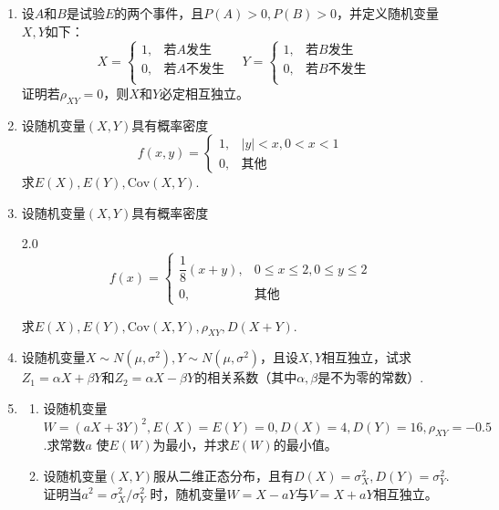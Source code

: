 \begin{enumerate}
    \item 设$A$和$B$是试验$E$的两个事件，且$P(A)>0,P(B)>0$，并定义随机变量$X,Y$如下：
    $$X=\left\{\begin{array}{ll}
        1, & \mbox{若}A\mbox{发生}\\
        0, & \mbox{若}A\mbox{不发生}\\
    \end{array}\right.\quad
    Y=\left\{\begin{array}{ll}
        1, & \mbox{若}B\mbox{发生}\\
        0, & \mbox{若}B\mbox{不发生}\\
    \end{array}\right.\quad$$
    证明若$\rho_{XY}=0$，则$X$和$Y$必定相互独立。


    \item 设随机变量$(X,Y)$具有概率密度
    $$f(x,y)=\left\{\begin{array}{ll}
        1, & |y|<x,0<x<1\\
        0, & \mbox{其他}
    \end{array}\right.$$
    求$E(X),E(Y),\mathrm{Cov}(X,Y)$.


    \item 设随机变量$(X,Y)$具有概率密度
    \vspace{-0.5cm}
    \begin{spacing}{2.0}
    $$f(x)=\left\{\begin{array}{ll}
        \dfrac{1}{8}(x+y), & 0\leq x\leq 2,0\leq y \leq 2\\
        0, & \mbox{其他}
    \end{array}\right.$$
    \end{spacing}
    \vspace{-0.5cm}
    求$E(X),E(Y),\mathrm{Cov}(X,Y),\rho_{XY},D(X+Y)$.


    \item 设随机变量$X\sim N(\mu,\sigma^2),Y\sim N(\mu,\sigma^2)$，且设$X,Y$相互独立，试求
    $Z_1=\alpha X+\beta Y$和$Z_2=\alpha X-\beta Y$的相关系数（其中$\alpha,\beta$是不为零的常数）.


    \item \begin{enumerate}
        \item 设随机变量$W=(aX+3Y)^2,E(X)=E(Y)=0,D(X)=4,D(Y)=16,\rho_{XY}=-0.5$.求常数$a$
        使$E(W)$为最小，并求$E(W)$的最小值。
        \item 设随机变量$(X,Y)$服从二维正态分布，且有$D(X)=\sigma_X^2,D(Y)=\sigma_Y^2$.证明当$a^2=\sigma^2_X/\sigma^2_Y$
        时，随机变量$W=X-aY$与$V=X+aY$相互独立。
    \end{enumerate}



\end{enumerate}
